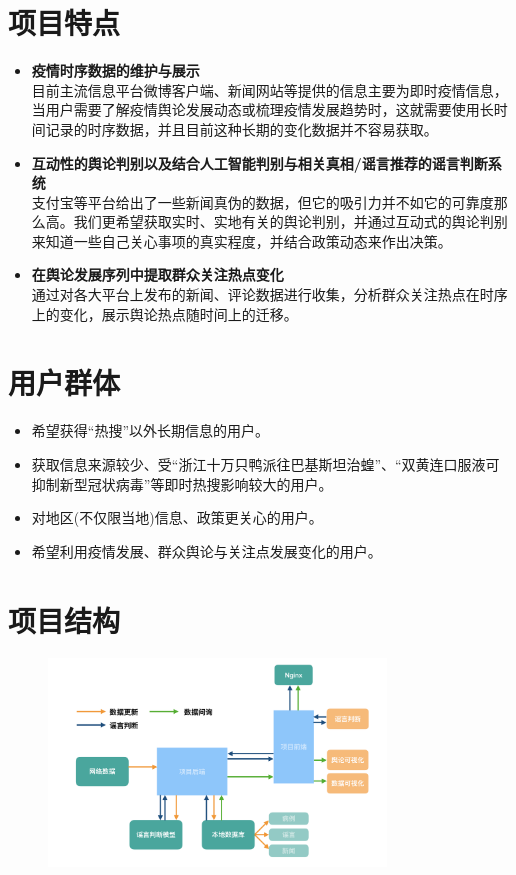 \documentclass{article}
\begin{document}
\section{项目特点}
\begin{itemize}
	\item{\textbf{疫情时序数据的维护与展示}\\
	目前主流信息平台微博客户端、新闻网站等提供的信息主要为即时疫情信息，当用户需要了解疫情舆论发展动态或梳理疫情发展趋势时，这就需要使用长时间记录的时序数据，并且目前这种长期的变化数据并不容易获取。}
	\item{\textbf{互动性的舆论判别以及结合人工智能判别与相关真相/谣言推荐的谣言判断系统}\\
	支付宝等平台给出了一些新闻真伪的数据，但它的吸引力并不如它的可靠度那么高。我们更希望获取实时、实地有关的舆论判别，并通过互动式的舆论判别来知道一些自己关心事项的真实程度，并结合政策动态来作出决策。}
	\item{\textbf{在舆论发展序列中提取群众关注热点变化}}\\
	通过对各大平台上发布的新闻、评论数据进行收集，分析群众关注热点在时序上的变化，展示舆论热点随时间上的迁移。



\end{itemize}

\section{用户群体}
\begin{itemize}
	\item{希望获得“热搜”以外长期信息的用户。}
	\item{获取信息来源较少、受“浙江十万只鸭派往巴基斯坦治蝗”、“双黄连口服液可抑制新型冠状病毒”等即时热搜影响较大的用户。}
	\item{对地区(不仅限当地)信息、政策更关心的用户。}
	\item{希望利用疫情发展、群众舆论与关注点发展变化的用户。}
\end{itemize}

\section{项目结构}
\begin{figure}[H]
\centering
\includegraphics[width=0.8\textwidth]{pic2.png}
\end{figure}
\end{document}
